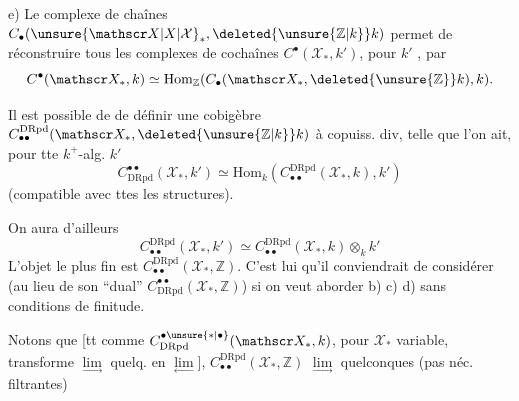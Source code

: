 e) Le complexe de chaînes $C_\bullet(\unsure{\mathscr X|X|\mathcal X}_\ast,\deleted{\unsure{\mathbb Z|k}}k)$ permet de réconstruire tous les complexes de cochaînes $C^\bullet(\mathscr X_\ast,k')$, pour $k'$  , par
\[
C^\bullet(\mathscr X_\ast,k)\simeq\mathrm{Hom}_{\mathbb Z}(C_\bullet(\mathscr X_\ast,\deleted{\unsure{\mathbb Z}}k),k).
\]

Il est possible de  de définir une cobigèbre  $C_{\bullet\bullet}^{\mathrm{DRpd}}(\mathscr X_\ast,\deleted{\unsure{\mathbb Z|k}}k)$  à copuiss. div, telle que l'on ait, pour tte $k^{+}$-alg. $k'$
\[
C^{\bullet\bullet}_{\mathrm{DRpd}}(\mathscr X_\ast,k')\simeq\mathrm{Hom}_k(C_{\bullet\bullet}^{\mathrm{DRpd}}(\mathscr X_\ast,k),k')
\]
(compatible avec ttes les structures).

On aura d'ailleurs
\[
C_{\bullet\bullet}^{\mathrm{DRpd}}(\mathscr X_\ast,k')\simeq C_{\bullet\bullet}^{\mathrm{DRpd}}(\mathscr X_\ast,k)\otimes_k k'
\]
L'objet le plus fin est $C_{\bullet\bullet}^{\mathrm{DRpd}}(\mathscr X_\ast,\mathbb Z)$. C'est lui qu'il conviendrait de considérer (au lieu de son ``dual'' $C^{\bullet\bullet}_{\mathrm{DRpd}}(\mathscr X_\ast,\mathbb Z)$) si on veut aborder b) c) d) sans conditions de finitude.

Notons que [tt comme $C^{\bullet\unsure{\ast|\bullet}}_{\mathrm{DRpd}}(\mathscr X_\ast,k)$, pour $\mathscr X_\ast$ variable, transforme $\underset{\longrightarrow}{\lim}$ quelq. en $\underset{\longleftarrow}{\lim}$], $C_{\bullet\bullet}^{\mathrm{DRpd}}(\mathscr X_\ast,\mathbb Z)$   $\underset{\longrightarrow}{\lim}$ quelconques (pas néc. filtrantes)

